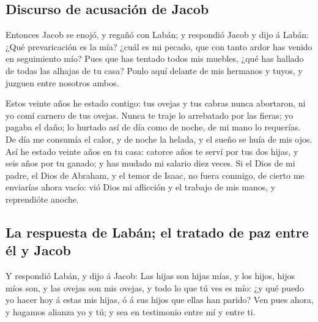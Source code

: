 \hypertarget{discurso-de-acusaciuxf3n-de-jacob}{%
\subsection{Discurso de acusación de
Jacob}\label{discurso-de-acusaciuxf3n-de-jacob}}

 Entonces Jacob se enojó, y regañó con Labán; y respondió
Jacob y dijo á Labán: ¿Qué prevaricación es la mía? ¿cuál es mi pecado,
que con tanto ardor has venido en seguimiento mío?  Pues
que has tentado todos mis muebles, ¿qué has hallado de todas las alhajas
de tu casa? Ponlo aquí delante de mis hermanos y tuyos, y juzguen entre
nosotros ambos.

 Estos veinte años he estado contigo: tus ovejas y tus
cabras nunca abortaron, ni yo comí carnero de tus ovejas. 
Nunca te traje lo arrebatado por las fieras; yo pagaba el daño; lo
hurtado así de día como de noche, de mi mano lo requerías. 
De día me consumía el calor, y de noche la helada, y el sueño se huía de
mis ojos.  Así he estado veinte años en tu casa: catorce
años te serví por tus dos hijas, y seis años por tu ganado; y has mudado
mi salario diez veces.  Si el Dios de mi padre, el Dios de
Abraham, y el temor de Isaac, no fuera conmigo, de cierto me enviarías
ahora vacío: vió Dios mi aflicción y el trabajo de mis manos, y
reprendióte anoche.

\hypertarget{la-respuesta-de-labuxe1n-el-tratado-de-paz-entre-uxe9l-y-jacob}{%
\subsection{La respuesta de Labán; el tratado de paz entre él y
Jacob}\label{la-respuesta-de-labuxe1n-el-tratado-de-paz-entre-uxe9l-y-jacob}}

 Y respondió Labán, y dijo á Jacob: Las hijas son hijas
mías, y los hijos, hijos míos son, y las ovejas son mis ovejas, y todo
lo que tú ves es mío: ¿y qué puedo yo hacer hoy á estas mis hijas, ó á
sus hijos que ellas han parido?  Ven pues ahora, y hagamos
alianza yo y tú; y sea en testimonio entre mí y entre ti.

